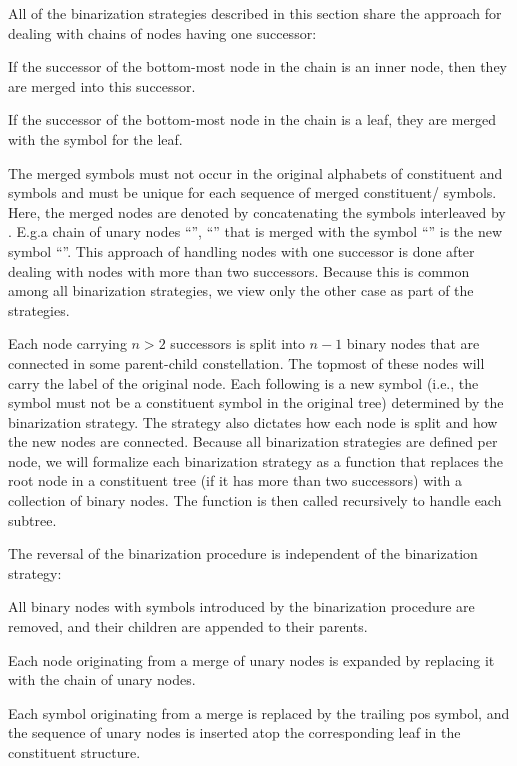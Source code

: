 \documentclass[../../document.tex]{subfiles}
\begin{document}
    All of the binarization strategies described in this section share the approach for dealing with chains of nodes having one successor:
    \begin{inparaenum}
        \item If the successor of the bottom-most node in the chain is an inner node, then they are merged into this successor.
        \item If the successor of the bottom-most node in the chain is a leaf, they are merged with the  symbol for the leaf.
    \end{inparaenum}
    The merged symbols must not occur in the original alphabets of constituent and  symbols and must be unique for each sequence of merged constituent/ symbols.
    Here, the merged nodes are denoted by concatenating the symbols interleaved by \cn{+}.
    E.g.\@ a chain of unary nodes ``'', ``'' that is merged with the  symbol ``'' is the new symbol ``''.
    This approach of handling nodes with one successor is done after dealing with nodes with more than two successors.
    Because this is common among all binarization strategies, we view only the other case as part of the strategies.

    Each node carrying \( n > 2 \) successors is split into \( n-1 \) binary nodes that are connected in some parent-child constellation.
    The topmost of these nodes will carry the label of the original node. Each following is a new symbol (i.e., the symbol must not be a constituent symbol in the original tree) determined by the binarization strategy.
    The strategy also dictates how each node is split and how the new nodes are connected.
    Because all binarization strategies are defined per node, we will formalize each binarization strategy as a function that replaces the root node in a constituent tree (if it has more than two successors) with a collection of binary nodes.
    The function is then called recursively to handle each subtree.

    The reversal of the binarization procedure is independent of the binarization strategy:
    \begin{compactenum}
        \item All binary nodes with symbols introduced by the binarization procedure are removed, and their children are appended to their parents.
        \item Each node originating from a merge of unary nodes is expanded by replacing it with the chain of unary nodes.
        \item Each  symbol originating from a merge is replaced by the trailing pos symbol, and the sequence of unary nodes is inserted atop the corresponding leaf in the constituent structure.
    \end{compactenum}
\end{document}
